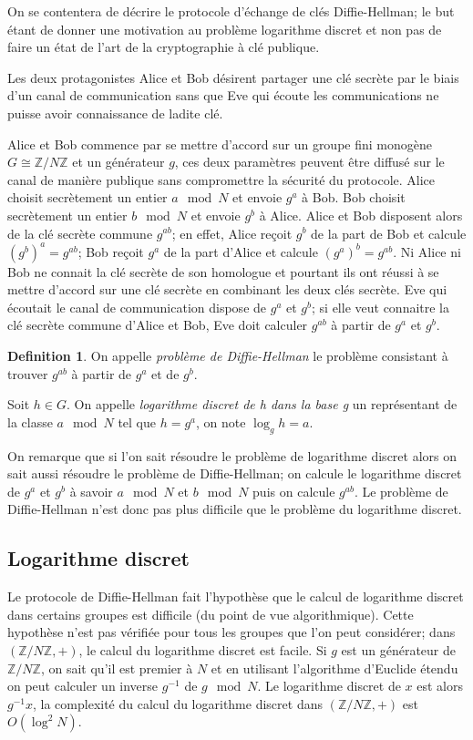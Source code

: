 \documentclass[a4paper]{article}
\theoremstyle{definition}
\newtheorem{definition}{Definition}[section]
\theoremstyle{remark}
\numberwithin{equation}{section}
\begin{document}
On se contentera de décrire le protocole d'échange de clés Diffie-Hellman; le but étant de donner une motivation au problème logarithme discret et non pas de faire un état de l'art de la cryptographie à clé publique.

Les deux protagonistes Alice et Bob désirent partager une clé secrète par le biais d'un canal de communication sans que Eve qui écoute les communications ne puisse avoir connaissance de ladite clé.

Alice et Bob commence par se mettre d'accord sur un groupe fini monogène $G \cong \mathbb{Z}/N\mathbb{Z}$ et un générateur $g$, ces deux paramètres peuvent être diffusé sur le canal de manière publique sans compromettre la sécurité du protocole. Alice choisit secrètement un entier $a \mod N$ et envoie $g^a$ à Bob. Bob choisit secrètement un entier $b \mod N$ et envoie $g^b$ à Alice. Alice et Bob disposent alors de la clé secrète commune $g^{ab}$; en effet, Alice reçoit $g^b$ de la part de Bob et calcule $(g^b)^a = g^{ab}$; Bob reçoit $g^a$ de la part d'Alice et calcule $(g^a)^b = g^{ab}$. Ni Alice ni Bob ne connait la clé secrète de son homologue et pourtant ils ont réussi à se mettre d'accord sur une clé secrète en combinant les deux clés secrète. Eve qui écoutait le canal de communication dispose de $g^a$ et $g^b$; si elle veut connaitre la clé secrète commune d'Alice et Bob, Eve doit calculer $g^{ab}$ à partir de $g^a$ et $g^b$.

\begin{definition}
On appelle \emph{problème de Diffie-Hellman} le problème consistant à trouver $g^{ab}$ à partir de $g^a$ et de $g^b$.

Soit $h \in G$. On appelle \emph{logarithme discret de h dans la base g} un représentant de la classe $a \mod N$ tel que $h=g^a$, on note $\log_g h = a$.
\end{definition}

On remarque que si l'on sait résoudre le problème de logarithme discret alors on sait aussi résoudre le problème de Diffie-Hellman; on calcule le logarithme discret de $g^a$ et $g^b$ à savoir $a \mod N$ et $b \mod N$ puis on calcule $g^{ab}$. Le problème de Diffie-Hellman n'est donc pas plus difficile que le problème du logarithme discret.

\subsection{Logarithme discret}
Le protocole de Diffie-Hellman fait l'hypothèse que le calcul de logarithme discret dans certains groupes est difficile (du point de vue algorithmique). Cette hypothèse n'est pas vérifiée pour tous les groupes que l'on peut considérer; dans $(\mathbb{Z}/N\mathbb{Z},+)$, le calcul du logarithme discret est facile. Si $g$ est un générateur de $\mathbb{Z}/N\mathbb{Z}$, on sait qu'il est premier à $N$ et en utilisant l'algorithme d'Euclide étendu on peut calculer un inverse $g^{-1}$ de $g \mod N$. Le logarithme discret de $x$ est alors $g^{-1}x$, la complexité du calcul du logarithme discret dans $(\mathbb{Z}/N\mathbb{Z},+)$ est $O(\log^2N)$.
\end{document}

